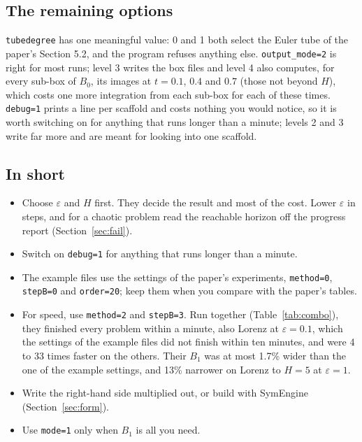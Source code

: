 \documentclass[11pt,a4paper]{article}
\newcommand{\eps}{\varepsilon}
\begin{document}
\subsection{The remaining options}

\texttt{tubedegree} has one meaningful value: 0 and 1 both select the Euler
tube of the paper's Section 5.2, and the program refuses anything else.
\texttt{output\_mode=2} is right for most runs; level 3 writes the box files
and level 4 also computes, for every sub-box of $B_0$, its images at
$t = 0.1$, $0.4$ and $0.7$ (those not beyond $H$), which costs one more
integration from each sub-box for each of these times. \texttt{debug=1} prints a line per scaffold and costs nothing you
would notice, so it is worth switching on for anything that runs longer than
a minute; levels 2 and 3 write far more and are meant for looking into one
scaffold.

\subsection{In short}

\begin{table}[htb]
\centering\small
\caption{The settings of the example files against \texttt{method=2} with
  \texttt{stepB=3}.}
\label{tab:combo}

\end{table}

\begin{itemize}
  \item Choose $\eps$ and $H$ first. They decide the result and most of the
        cost. Lower $\eps$ in steps, and for a chaotic problem read the
        reachable horizon off the progress report (Section~\ref{sec:fail}).
  \item Switch on \texttt{debug=1} for anything that runs longer than a
        minute.
  \item The example files use the settings of the paper's experiments,
        \texttt{method=0}, \texttt{stepB=0} and \texttt{order=20}; keep them
        when you compare with the paper's tables.
  \item For speed, use \texttt{method=2} and \texttt{stepB=3}. Run together
        (Table~\ref{tab:combo}), they finished every problem within a
        minute, also Lorenz at $\eps = 0.1$, which the settings of the
        example files did not finish within ten minutes, and were 4 to 33
        times faster on the others. Their $B_1$ was at most 1.7\% wider than
        the one of the example settings, and 13\% narrower on Lorenz to
        $H = 5$ at $\eps = 1$.
  \item Write the right-hand side multiplied out, or build with SymEngine
        (Section~\ref{sec:form}).
  \item Use \texttt{mode=1} only when $B_1$ is all you need.
\end{itemize}
\end{document}
